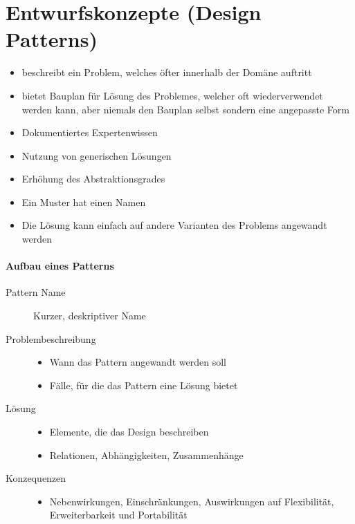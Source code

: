 \documentclass[ngerman,color=3b]{tuda_summary}
\begin{document}
\clearpage
\section{Entwurfskonzepte (Design Patterns)}
\begin{definition}\mbox{}
    \begin{itemize}
        \item beschreibt ein Problem, welches öfter innerhalb der Domäne auftritt
        \item bietet Bauplan für Lösung des Problemes, welcher oft wiederverwendet werden kann, aber niemals den Bauplan selbst sondern eine angepasste Form
    \end{itemize}
\end{definition}
\begin{itemize}
    \item Dokumentiertes Expertenwissen
    \item Nutzung von generischen Lösungen
    \item Erhöhung des Abstraktionsgrades
    \item Ein Muster hat einen Namen
    \item Die Lösung kann einfach auf andere Varianten des Problems angewandt werden
\end{itemize}
\paragraph{Aufbau eines Patterns}\begin{description}
    \item[Pattern Name] Kurzer, deskriptiver Name
    \item[Problembeschreibung] \begin{itemize}
              \item Wann das Pattern angewandt werden soll
              \item Fälle, für die das Pattern eine Lösung bietet
          \end{itemize}
    \item[Lösung] \begin{itemize}
              \item Elemente, die das Design beschreiben
              \item Relationen, Abhängigkeiten, Zusammenhänge
          \end{itemize}
    \item[Konzequenzen] \begin{itemize}
              \item Nebenwirkungen, Einschränkungen, Auswirkungen auf Flexibilität, Erweiterbarkeit und Portabilität
          \end{itemize}
\end{description}
\end{document}
